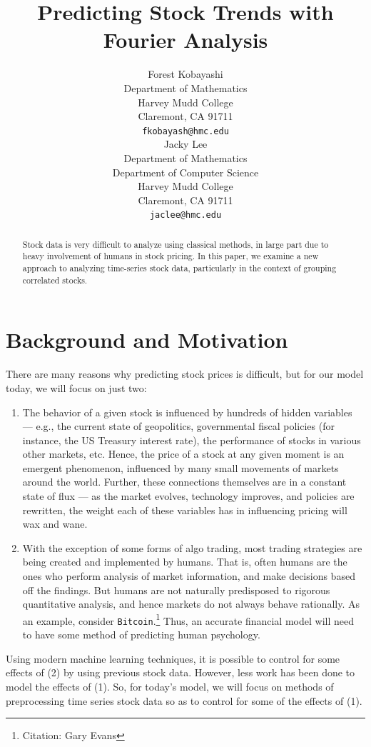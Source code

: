 \documentclass[final]{article}
\title{Predicting Stock Trends with Fourier Analysis}
\author{
  Forest Kobayashi \\
  Department of Mathematics\\
  Harvey Mudd College\\
  Claremont, CA 91711 \\
  \texttt{fkobayash@hmc.edu} \\
  \And
  Jacky Lee \\
  Department of Mathematics\\
  Department of Computer Science \\
  Harvey Mudd College \\
  Claremont, CA 91711 \\
  \texttt{jaclee@hmc.edu}
}
\begin{document}

\maketitle

\begin{abstract}
  Stock data is very difficult to analyze using classical methods, in
  large part due to heavy involvement of humans in stock pricing. In
  this paper, we examine a new approach to analyzing time-series stock
  data, particularly in the context of grouping correlated stocks.
\end{abstract}

\section{Background and Motivation}

There are many reasons why predicting stock prices is difficult, but
for our model today, we will focus on just two:
\begin{enumerate}
  \item The behavior of a given stock is influenced by hundreds of
    hidden variables --- e.g., the current state of geopolitics,
    governmental fiscal policies (for instance, the US Treasury
    interest rate), the performance of stocks in various other
    markets, etc. Hence, the price of a stock at any given moment is
    an emergent phenomenon, influenced by many small movements of
    markets around the world. Further, these connections themselves
    are in a constant state of flux --- as the market evolves,
    technology improves, and policies are rewritten, the weight each
    of these variables has in influencing pricing will wax and wane.
  \item With the exception of some forms of algo trading, most trading
    strategies are being created and implemented by humans. That is,
    often humans are the ones who perform analysis of market
    information, and make decisions based off the findings. But humans
    are not naturally predisposed to rigorous quantitative analysis,
    and hence markets do not always behave rationally. As an example,
    consider \texttt{Bitcoin}.\footnote{Citation: Gary Evans} Thus,
    an accurate financial model will need to have some method of
    predicting human psychology.
\end{enumerate}

Using modern machine learning techniques, it is possible to control
for some effects of (2) by using previous stock data. However,
less work has been done to model the effects of (1). So, for today's
model, we will focus on methods of preprocessing time series stock
data so as to control for some of the effects of (1).
\end{document}
